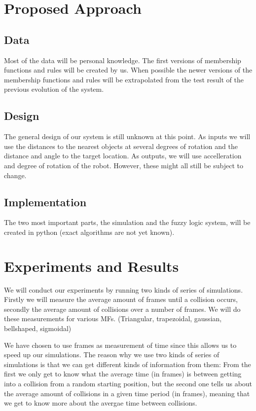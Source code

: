 \documentclass[conference]{IEEEtran}
\begin{document}
\section{Proposed Approach}
\subsection{Data}
Most of the data will be personal knowledge. The first versions of membership functions and rules will be created by us. When possible the newer versions of the membership functions and rules will be extrapolated from the test result of the previous evolution of the system.
\subsection{Design}
The general design of our system is still unknown at this point. As inputs we will use the distances to the nearest objects at several degrees of rotation and the distance and angle to the target location. As outputs, we will use accelleration and degree of rotation of the robot. However, these might all still be subject to change.
\subsection{Implementation}
The two most important parts, the simulation and the fuzzy logic system, will be created in python (exact algorithms are not yet known).

\section{Experiments and Results}
We will conduct our experiments by running two kinds of series of simulations. Firstly we will measure the average amount of frames until a collision occurs, secondly the average amount of collisions over a number of frames. We will do these measurements for various MFs. (Triangular, trapezoidal, gaussian, bellshaped, sigmoidal)

We have chosen to use frames as measurement of time since this allows us to speed up our simulations. The reason why we use two kinds of series of simulations is that we can get different kinds of information from them: From the first we only get to know what the average time (in frames) is between getting into a collision from a random starting position, but the second one tells us about the average amount of collisions in a given time period (in frames), meaning that we get to know more about the avergae time between collisions.
\end{document}
